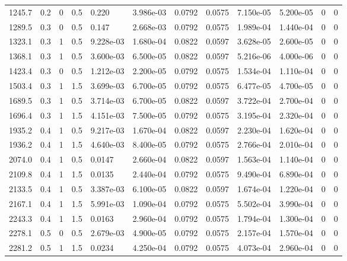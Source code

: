 \documentclass[preview]{standalone}
\begin{document}
{{\begin{tabular}{L{1.2cm}C{1.2cm} C{0.3cm}C{0.5cm} C{1.4cm}C{1.4cm} C{1.4cm}C{1.4cm} C{1.6cm}C{1.6cm} C{1.6cm}C{1.6cm}}
  1245.7  &   0.2  & 0     & 0.5 &  0.220  & 3.986e-03  &  0.0792&   0.0575& 7.150e-05 & 5.200e-05   &  0 & 0  \\ 
  1289.5  &   0.3  & 0     & 0.5 &  0.147  & 2.668e-03  &  0.0792&   0.0575& 1.989e-04 & 1.440e-04   &  0 & 0  \\ 
  1323.1  &   0.3  & 1     & 0.5 &  9.228e-03  & 1.680e-04  &  0.0822&   0.0597& 3.628e-05 & 2.600e-05   &  0 & 0  \\ 
  1368.1  &   0.3  & 1     & 0.5 &  3.600e-03  & 6.500e-05  &  0.0822&   0.0597& 5.216e-06 & 4.000e-06   &  0 & 0  \\ 
  1423.4  &   0.3  & 0     & 0.5 &  1.212e-03  & 2.200e-05  &  0.0792&   0.0575& 1.534e-04 & 1.110e-04   &  0 & 0  \\ 
  1503.4  &   0.3  & 1     & 1.5 &  3.699e-03  & 6.700e-05  &  0.0792&   0.0575& 6.477e-05 & 4.700e-05   &  0 & 0  \\ 
  1689.5  &   0.3  & 1     & 0.5 &  3.714e-03  & 6.700e-05  &  0.0822&   0.0597& 3.722e-04 & 2.700e-04   &  0 & 0  \\ 
  1696.4  &   0.3  & 1     & 1.5 &  4.151e-03  & 7.500e-05  &  0.0792&   0.0575& 3.195e-04 & 2.320e-04   &  0 & 0  \\ 
  1935.2  &   0.4  & 1     & 0.5 &  9.217e-03  & 1.670e-04  &  0.0822&   0.0597& 2.230e-04 & 1.620e-04   &  0 & 0  \\ 
  1936.2  &   0.4  & 1     & 1.5 &  4.640e-03  & 8.400e-05  &  0.0792&   0.0575& 2.766e-04 & 2.010e-04   &  0 & 0  \\ 
  2074.0  &   0.4  & 1     & 0.5 &  0.0147  & 2.660e-04  &  0.0822&   0.0597& 1.563e-04 & 1.140e-04   &  0 & 0  \\ 
  2109.8  &   0.4  & 1     & 1.5 &  0.0135  & 2.440e-04  &  0.0792&   0.0575& 9.490e-04 & 6.890e-04   &  0 & 0  \\ 
  2133.5  &   0.4  & 1     & 0.5 &  3.387e-03  & 6.100e-05  &  0.0822&   0.0597& 1.674e-04 & 1.220e-04   &  0 & 0  \\ 
  2167.1  &   0.4  & 1     & 1.5 &  5.991e-03  & 1.090e-04  &  0.0792&   0.0575& 5.502e-04 & 3.990e-04   &  0 & 0  \\ 
  2243.3  &   0.4  & 1     & 1.5 &  0.0163  & 2.960e-04  &  0.0792&   0.0575& 1.794e-04 & 1.300e-04   &  0 & 0  \\ 
  2278.1  &   0.5  & 0     & 0.5 &  2.679e-03  & 4.900e-05  &  0.0792&   0.0575& 2.157e-04 & 1.570e-04   &  0 & 0  \\ 
  2281.2  &   0.5  & 1     & 1.5 &  0.0234  & 4.250e-04  &  0.0792&   0.0575& 4.073e-04 & 2.960e-04   &  0 & 0  \\ 

\end{tabular}}}
\end{document}
